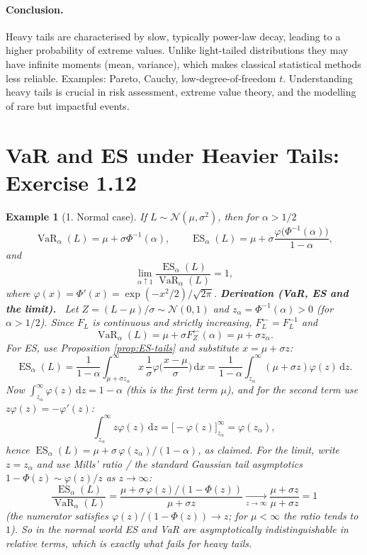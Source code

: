 \documentclass[11pt,a4paper]{article}
\newtheorem{example}{Example}
\newcommand{\VaR}{\operatorname{VaR}}
\newcommand{\ES}{\operatorname{ES}}
\newcommand{\N}{\mathcal{N}}
\newcommand{\dd}{\,\mathrm{d}}
\newcommand{\der}[1]{\medskip\noindent\textbf{Derivation (#1).}\ }
\begin{document}
\paragraph{Conclusion.} Heavy tails are characterised by slow, typically power-law decay, leading to
a higher probability of extreme values. Unlike light-tailed distributions they may have infinite
moments (mean, variance), which makes classical statistical methods less reliable. Examples: Pareto,
Cauchy, low-degree-of-freedom $t$. Understanding heavy tails is crucial in risk assessment, extreme
value theory, and the modelling of rare but impactful events.

\section{VaR and ES under Heavier Tails: Exercise 1.12}

\begin{example}[1. Normal case]\label{ex:normal}
If $L\sim\N(\mu,\sigma^2)$, then for $\alpha>1/2$
\[
  \VaR_\alpha(L)=\mu+\sigma\Phi^{-1}(\alpha),\qquad
  \ES_\alpha(L)=\mu+\sigma\frac{\varphi\big(\Phi^{-1}(\alpha)\big)}{1-\alpha},
\]
and
\[
  \lim_{\alpha\uparrow1}\frac{\ES_\alpha(L)}{\VaR_\alpha(L)}=1,
\]
where $\varphi(x)=\Phi'(x)=\exp(-x^2/2)/\sqrt{2\pi}$.
\der{VaR, ES and the limit}
Let $Z=(L-\mu)/\sigma\sim\N(0,1)$ and $z_\alpha=\Phi^{-1}(\alpha)>0$ (for $\alpha>1/2$). Since
$F_L$ is continuous and strictly increasing, $F_L^{\leftarrow}=F_L^{-1}$ and
\[
  \VaR_\alpha(L)=\mu+\sigma F_Z^{\leftarrow}(\alpha)=\mu+\sigma z_\alpha .
\]
For ES, use Proposition \ref{prop:ES-tails} and substitute $x=\mu+\sigma z$:
\[
  \ES_\alpha(L)=\frac{1}{1-\alpha}\int_{\mu+\sigma z_\alpha}^{\infty}
        x\,\frac{1}{\sigma}\varphi\Big(\frac{x-\mu}{\sigma}\Big)\dd x
   =\frac{1}{1-\alpha}\int_{z_\alpha}^{\infty}(\mu+\sigma z)\varphi(z)\dd z .
\]
Now $\int_{z_\alpha}^\infty\varphi(z)\dd z=1-\alpha$ (this is the first term $\mu$), and for the second
term use $z\varphi(z)=-\varphi'(z)$:
\[
  \int_{z_\alpha}^{\infty} z\varphi(z)\dd z
   =\Big[-\varphi(z)\Big]_{z_\alpha}^{\infty}=\varphi(z_\alpha),
\]
hence $\ES_\alpha(L)=\mu+\sigma\,\varphi(z_\alpha)/(1-\alpha)$, as claimed.
For the limit, write $z=z_\alpha$ and use Mills' ratio / the standard Gaussian tail asymptotics
$1-\Phi(z)\sim\varphi(z)/z$ as $z\to\infty$:
\[
  \frac{\ES_\alpha(L)}{\VaR_\alpha(L)}
  =\frac{\mu+\sigma\,\varphi(z)/(1-\Phi(z))}{\mu+\sigma z}
  \xrightarrow[z\to\infty]{}\frac{\mu+\sigma z}{\mu+\sigma z}=1
\]
(the numerator satisfies $\varphi(z)/(1-\Phi(z))\to z$; for $\mu<\infty$ the ratio tends to $1$).
So in the normal world ES and VaR are asymptotically indistinguishable in \emph{relative} terms, which
is exactly what fails for heavy tails.
\end{example}
\end{document}
